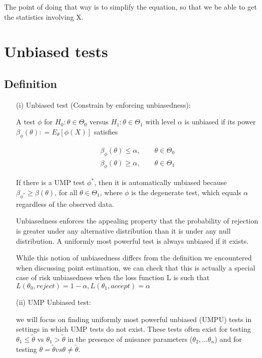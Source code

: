 \documentclass[11pt]{article} %
\begin{document}
The point of doing that way is to simplify the equation, so that we be able to get the statistics involving X.


\section{Unbiased tests}

\subsection{Definition}


\begin{itemize}
	\item [(i)] Unbiased test (Constrain by enforcing unbiasedness):
	
A test $\phi$ for $H_0: \theta \in \Theta_0$ versus $H_1: \theta \in \Theta_1$ with level $\alpha$ is unbiased if its power $\beta_{\phi}(\theta): = E_{\theta}[\phi(X)]$ satisfies

\begin{align*}
	\beta_{\phi}(\theta) \leq \alpha, \qquad \theta \in \Theta_0 \\
	\beta_{\phi}(\theta) \geq \alpha, \qquad \theta \in \Theta_1
\end{align*}

If there is a UMP test $\phi^{\ast}$, then it is automatically unbiased because $\beta_{\phi^{\ast}} \geq \beta(\theta)$, for all $\theta \in \Theta_1$, where $\phi$ is the degenerate test, which equals $\alpha$ regardless of the observed data.
	
Unbiasedness enforces the appealing property that the probability of rejection is greater under any alternative distribution than it is under any null distribution. A uniformly most
powerful test is always unbiased if it exists.

While this notion of unbiasedness differs from the definition we encountered when discussing point estimation, we can check that this is actually a special case of risk unbiasedness when
the loss function L is such that $L(\theta_0, reject) = 1- \alpha, L(\theta_1, accept) = \alpha$

	\item[(ii)] UMP Unbiased test:

we will focus on finding uniformly most powerful unbiased (UMPU) tests in settings in which UMP tests do not exist. These tests often exist for testing $\theta_1 \leq \tilde{\theta}$ vs $\theta_1 > \tilde{\theta}$ in the presence of nuisance parameters ($\theta_2, …\theta_n$) and for testing $\theta = \tilde{\theta} vs \theta \neq \tilde{\theta}$.


\end{itemize}
\end{document}
